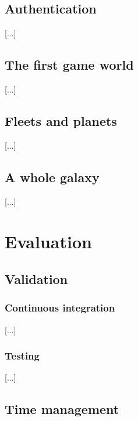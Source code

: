 \documentclass[a4paper,11pt,titlepage,abstract,numbers=noenddot,automark,mnsy,intlimits,rgb,dvipsnames]{report}
\begin{document}
\chapter{Authentication}
[...]
\chapter{The first game world}
[...]
\chapter{Fleets and planets}
[...]
\chapter{A whole galaxy}
[...]
\part{Evaluation}
\chapter{Validation}
\label{validation}
\section{Continuous integration}
[...]
\section{Testing}
[...]
\chapter{Time management}
\end{document}
